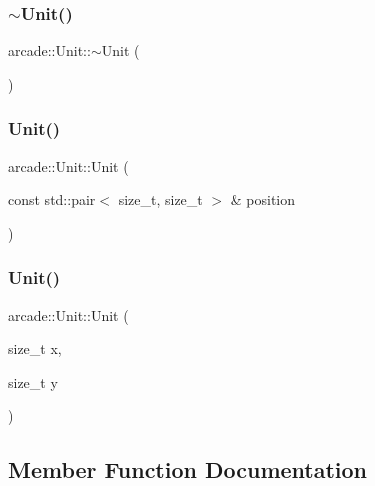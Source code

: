 \subsubsection{\texorpdfstring{$\sim$\+Unit()}{~Unit()}}
{\footnotesize\ttfamily arcade\+::\+Unit\+::$\sim$\+Unit (\begin{DoxyParamCaption}{ }\end{DoxyParamCaption})\hspace{0.3cm}{\ttfamily [virtual]}}

\mbox{\label{classarcade_1_1_unit_a34cb0964152e5039495031ec7be15613}} 
\subsubsection{\texorpdfstring{Unit()}{Unit()}\hspace{0.1cm}{\footnotesize\ttfamily [1/2]}}
{\footnotesize\ttfamily arcade\+::\+Unit\+::\+Unit (\begin{DoxyParamCaption}\item[{const std\+::pair$<$ size\+\_\+t, size\+\_\+t $>$ \&}]{position }\end{DoxyParamCaption})}

\mbox{\label{classarcade_1_1_unit_abf639f95e434f9920cb6a342784e8d4e}} 
\subsubsection{\texorpdfstring{Unit()}{Unit()}\hspace{0.1cm}{\footnotesize\ttfamily [2/2]}}
{\footnotesize\ttfamily arcade\+::\+Unit\+::\+Unit (\begin{DoxyParamCaption}\item[{size\+\_\+t}]{x,  }\item[{size\+\_\+t}]{y }\end{DoxyParamCaption})}



\subsection{Member Function Documentation}
\mbox{\label{classarcade_1_1_unit_ab79c51d02d31cc6578cc25b202e4292d}} 

